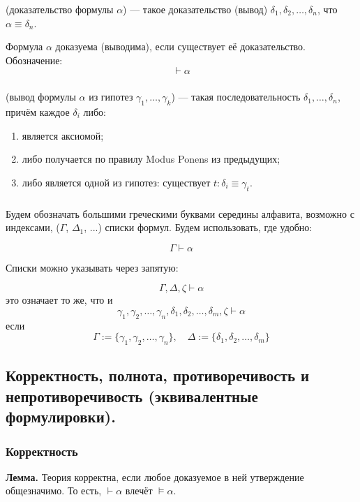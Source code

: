 \documentclass[10pt,a4paper,oneside]{article}
\begin{document}
\subsubsection{}

(доказательство формулы $\alpha$)
--- такое доказательство (вывод) $\delta_1, \delta_2, \dots, \delta_n$,
что $\alpha\equiv\delta_n$.

Формула $\alpha$ доказуема (выводима), если существует её доказательство. Обозначение:
$$\vdash \alpha$$

\subsubsection{}
(вывод формулы $\alpha$ из гипотез $\gamma_1,\dots,\gamma_k$)
    --- такая последовательность
    $\delta_1,\dots,\delta_n$, причём каждое $\delta_i$ либо:
    \begin{enumerate}
    \item является аксиомой;
    \item либо получается по правилу Modus Ponens из предыдущих;
    \item либо является одной из гипотез: существует $t: \delta_i \equiv \gamma_t$.
    \end{enumerate}

\subsubsection{}
Будем обозначать большими греческими буквами середины
алфавита, возможно с индексами, ($\Gamma$, $\Delta_1$, ...) списки формул.
Будем использовать, где удобно:

$$\Gamma \vdash \alpha$$

Списки можно указывать через запятую:

$$\Gamma, \Delta, \zeta \vdash \alpha$$
это означает то же, что и 
$$\gamma_1,\gamma_2,\dots,\gamma_n,\delta_1,\delta_2,\dots,\delta_m,\zeta\vdash\alpha$$
если 
$$\Gamma := \{\gamma_1,\gamma_2,\dots,\gamma_n\},\quad \Delta := \{\delta_1,\delta_2,\dots,\delta_m\}$$


\subsection{Корректность, полнота, противоречивость и непротиворечивость (эквивалентные формулировки).}

\subsubsection{Корректность}
\textbf{ Лемма. }
Теория корректна, если любое доказуемое в ней утверждение общезначимо.
То есть, $\vdash\alpha$ влечёт $\models\alpha$.
\end{document}
